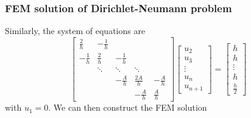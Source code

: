 \documentclass[12pt]{article}
\begin{document}
\subsubsection{FEM solution of Dirichlet-Neumann problem}
Similarly, the system of equations are
\[
\begin{bmatrix}
\frac{2}{h} & -\frac{1}{h} \\
-\frac{1}{h} & \frac{2}{h} & -\frac{1}{h} \\
& \ddots & \ddots & \ddots \\
&& -\frac{A}{h} & \frac{2A}{h} & -\frac{A}{h} \\
&&& -\frac{A}{h} & \frac{A}{h}
\end{bmatrix}
\begin{bmatrix}
u_{2} \\
u_{3} \\
\vdots \\
u_{n} \\
u_{n+1}
\end{bmatrix}
=
\begin{bmatrix}
h \\
h \\
\vdots \\
h \\
\frac{h}{2}
\end{bmatrix}
\]
with $u_{1}=0$. We can then construct the FEM solution
\end{document}
